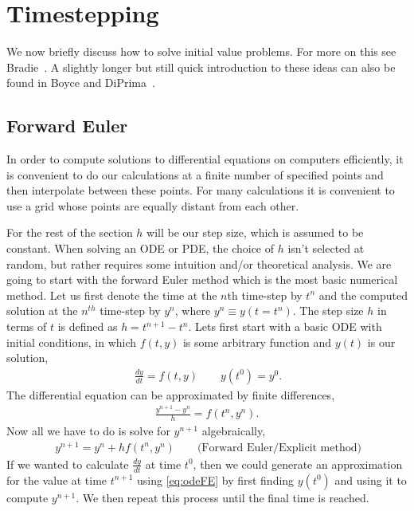 \chapter{Timestepping}
We now briefly discuss how to solve initial value problems. For more on this see Bradie~\cite[Chap. 7]{Bra06}. A slightly longer but still quick introduction to these ideas can also be found in Boyce and DiPrima~\cite{BoyDip10}.
\section{Forward Euler}
In order to compute solutions to differential equations on computers efficiently, it is convenient to do our calculations at a finite number of specified points and then interpolate between these points. For many calculations it is convenient to use a grid whose points are equally distant from each other. 

For the rest of the section $h$ will be our step size, which is assumed to be constant.  When solving an ODE or PDE, the choice of $h$ isn't selected at random, but rather requires some intuition and/or theoretical analysis. We are going to start with the forward Euler method which is the most basic numerical method. Let us first denote the time at the $n$th time-step by $t^n$ and the computed solution at the $n^{th}$ time-step by $y^n$, where $y^n \equiv y(t=t^n)$. The step size $h$ in terms of $t$ is defined as $h=t^{n+1}-t^n$. Lets first start with a basic ODE with initial conditions, in which $f(t,y)$ is some arbitrary function and $y(t)$ is our solution,
\begin{eqnarray}\label{eq:ode}
\ \frac{dy}{dt} = f(t,y) \qquad y(t^0)=y^0.
\end{eqnarray}
The differential equation can be approximated by finite differences, 
\begin{eqnarray}
\frac{y^{n+1}-y^n}{h} = f(t^n,y^n).
\end{eqnarray}
Now all we have to do is solve for $y^{n+1}$ algebraically,
\begin{eqnarray}\label{eq:odeFE}
\ y^{n+1}=y^n+h f(t^n,y^n) \qquad \text{(Forward Euler/Explicit method)}
\end{eqnarray}
If we wanted to calculate $\frac{dy}{dt}$ at time $t^0$, then we could generate an approximation for the value at time $t^{n+1}$ using \eqref{eq:odeFE} by first finding $y(t^0)$ and using it to compute $y^{n+1}$. We then repeat this process until the final time is reached.

